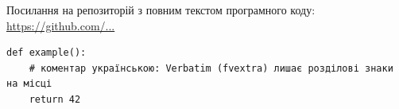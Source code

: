 \documentclass{kpi-thesis}
\begin{document}
\mainmatter

\noindent Посилання на репозиторій з повним текстом програмного коду: \url{https://github.com/...}

\begin{Verbatim}
def example():
    # коментар українською: Verbatim (fvextra) лишає розділові знаки на місці
    return 42
\end{Verbatim}
\end{document}
